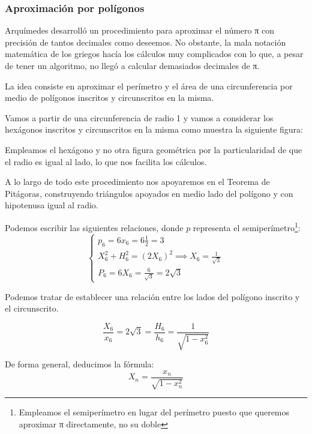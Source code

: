 \documentclass{apuntes}
\begin{document}
\subsubsection{Aproximación por polígonos}
Arquímedes desarrolló un procedimiento para aproximar el número π con precisión de tantos decimales como deseemos. No obstante, la mala notación matemática de los griegos hacía los cálculos muy complicados con lo que, a pesar de tener un algoritmo, no llegó a calcular demasiados decimales de π.


La idea consiste en aproximar el perímetro y el área de una circunferencia por medio de polígonos inscritos y circunscritos en la misma.

Vamos a partir de una circunferencia de radio 1 y vamos a considerar los hexágonos inscritos y circunscritos en la misma como muestra la siguiente figura:


\begin{minipage}{0.47\textwidth}
\begin{center}
\end{center}
\end{minipage}
\begin{minipage}{0.52\textwidth}
\obs Empleamos el hexágono y no otra figura geométrica por la particularidad de que el radio es igual al lado, lo que nos facilita los cálculos.

\obs A lo largo de todo este procedimiento nos apoyaremos en el Teorema de Pitágoras, construyendo triángulos apoyados en medio lado del polígono y con hipotenusa igual al radio.
\end{minipage}


Podemos escribir las siguientes relaciones, donde $p$ representa el semiperímetro\footnote{Empleamos el semiperímetro en lugar del perímetro puesto que queremos aproximar π directamente, no su doble}:
\[\left\{ \begin{array}{l} 
p_6 = 6x_6 = 6 \frac{1}{2} = 3\\
X_6^2+H_6^2=(2X_6)^2 \implies X_6 = \frac{1}{\sqrt{3}}\\
P_6 = 6X_6 = \frac{6}{\sqrt{3}} = 2\sqrt{3}
\end{array}\right.\]

Podemos tratar de establecer una relación entre los lados del polígono inscrito y el circunscrito.

\[\frac{X_6}{x_6} = 2\sqrt{3} = \frac{H_6}{h_6} = \frac{1}{\sqrt{1-x_6^2}}\]

De forma general, deducimos la fórmula:
\[X_n=\frac{x_n}{\sqrt{1-x_n^2}}\]
\end{document}
